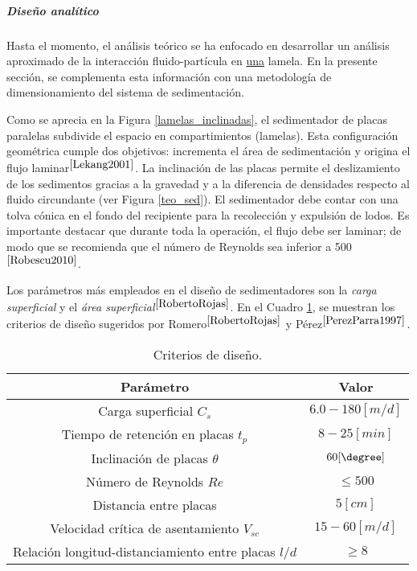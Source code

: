 \subparagraph{Dise\~no anal\'itico}

\noindent
\justify

Hasta el momento, el an\'alisis te\'orico se ha enfocado en desarrollar un an\'alisis aproximado de la interacci\'on fluido-part\'icula en \underline{una} lamela. En la presente secci\'on, se complementa esta informaci\'on con una metodolog\'ia de dimensionamiento del sistema de sedimentaci\'on.

\noindent
\justify

Como se aprecia en la Figura \ref{lamelas_inclinadas}, el sedimentador de placas paralelas subdivide el espacio en compartimientos (lamelas). Esta configuraci\'on geom\'etrica cumple dos objetivos: incrementa el \'area de sedimentaci\'on y origina el flujo laminar$^{\cite{Lekang2001}}$. La inclinaci\'on de las placas permite el deslizamiento de los sedimentos gracias a la gravedad y a la diferencia de densidades respecto al fluido circundante (ver Figura \ref{teo_sed}). El sedimentador debe contar con una tolva c\'onica en el fondo del recipiente para la recolecci\'on y expulsi\'on de lodos. Es importante destacar que durante toda la operaci\'on, el flujo debe ser laminar; de modo que se recomienda que el n\'umero de Reynolds sea inferior a 500$^{\cite{Robescu2010}}$. 

\noindent
\justify

Los par\'ametros m\'as empleados en el dise\~no de sedimentadores son la \textit{carga superficial} y el \textit{\'area superficial}$^{\cite{RobertoRojas}}$. En el Cuadro \ref{critSed}, se muestran los criterios de dise\~no sugeridos por Romero$^{\cite{RobertoRojas}}$ y P\'erez$^{\cite{PerezParra1997}}$.

\begin{table}[h!]
	\centering
	\begin{tabular}{|c|c|}
		\hline
		\textbf{Par\'ametro} & \textbf{Valor} \\ \hline
		Carga superficial $C_s$ & $6.0 - 180 [m/d]$ \\ \hline
		Tiempo de retenci\'on en placas $t_p$ & $8 - 25 [min]$ \\ \hline
		Inclinaci\'on de placas $\theta$ & $60 [\degree]$ \\ \hline
		N\'umero de Reynolds $Re$ & $\le 500$ \\ \hline
		Distancia entre placas & $5 [cm]$ \\ \hline
		Velocidad cr\'itica de asentamiento $V_{sc}$ & $15 - 60 [m/d]$ \\ \hline
		Relaci\'on longitud-distanciamiento entre placas $l/d$ & $\ge 8$ \\ \hline
	\end{tabular}
	\caption{Criterios de dise\~no.}
	\label{critSed}
\end{table}


